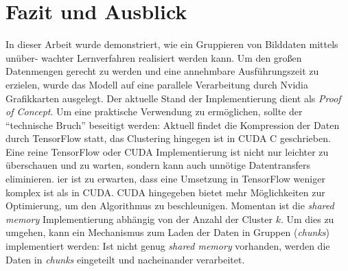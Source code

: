 \chapter{Fazit und Ausblick}

In dieser Arbeit wurde demonstriert, wie ein Gruppieren von Bilddaten mittels unüber- wachter Lernverfahren realisiert werden kann. Um den großen Datenmengen gerecht zu werden und eine annehmbare Ausführungszeit zu erzielen, wurde das Modell auf eine parallele Verarbeitung durch Nvidia Grafikkarten ausgelegt. Der aktuelle Stand der Implementierung dient als \textit{Proof of Concept}. Um eine praktische Verwendung zu ermöglichen, sollte der \enquote{technische Bruch} beseitigt werden: Aktuell findet die Kompression der Daten durch TensorFlow statt, das Clustering hingegen ist in CUDA C geschrieben. Eine reine TensorFlow oder CUDA Implementierung ist nicht nur leichter zu überschauen und zu warten, sondern kann auch unnötige Datentransfers eliminieren. ier ist zu erwarten, dass eine Umsetzung in TensorFlow weniger komplex ist als in CUDA. CUDA hingegeben bietet mehr Möglichkeiten zur Optimierung, um den Algorithmus zu beschleunigen. Momentan ist die \textit{shared memory} Implementierung abhängig von der Anzahl der Cluster $k$. Um dies zu umgehen, kann ein Mechanismus zum Laden der Daten in Gruppen (\textit{chunks}) implementiert werden: Ist nicht genug \textit{shared memory} vorhanden, werden die Daten in \textit{chunks} eingeteilt und nacheinander verarbeitet.